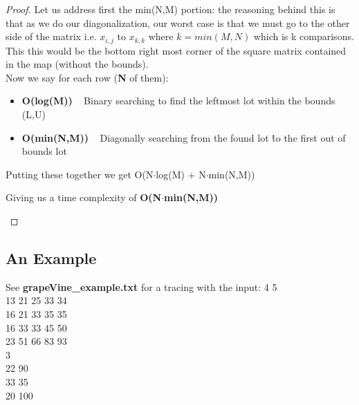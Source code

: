 \documentclass[12pt]{article}
\begin{document}
\begin{proof}
Let us address first the min(N,M) portion: the reasoning behind this is that as we do our diagonalization,
our worst case is that we must go to the other side of the matrix i.e. $x_{i,j}$ to $x_{k,k}$ where $k = min(M,N)$
which is k comparisons. This this would be the bottom right most corner of the square matrix contained in the map
(without the bounds). \\
Now we say for each row (\textbf{N} of them):
\begin{itemize}
    \item \textbf{O(log(M))} ~ Binary searching to find the leftmost lot within the bounds (L,U)
    \item \textbf{O(min(N,M))} ~ Diagonally searching from the found lot \^ to the first out of bounds lot
\end{itemize}
Putting these together we get O(N$\cdot$log(M) + N$\cdot$min(N,M))
\begin{center}
    Giving us a time complexity of \textbf{O(N$\cdot$min(N,M))}
\end{center}
\end{proof}


\subsection{An Example}
See \textbf{grapeVine\_example.txt} for a tracing with the input:
4 5 \\
13 21 25 33 34 \\
16 21 33 35 35 \\
16 33 33 45 50 \\
23 51 66 83 93 \\
3 \\
22 90  \\
33 35  \\
20 100 \\


\newpage
\end{document}
